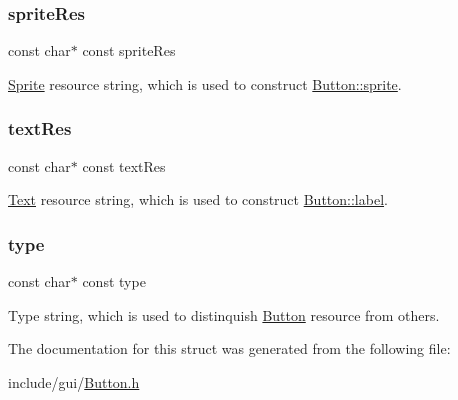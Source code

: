 \subsubsection{\texorpdfstring{sprite\+Res}{spriteRes}}
{\footnotesize\ttfamily const char$\ast$ const sprite\+Res}

\hyperlink{struct_sprite}{Sprite} resource string, which is used to construct \hyperlink{struct_button_a1128327f94baacb1570a98fca0591108}{Button\+::sprite}. \hypertarget{struct_button_scene_node__parser_strings_ab8666a8039b6fdab629c3e0853421c3c}{}\label{struct_button_scene_node__parser_strings_ab8666a8039b6fdab629c3e0853421c3c} 
\subsubsection{\texorpdfstring{text\+Res}{textRes}}
{\footnotesize\ttfamily const char$\ast$ const text\+Res}

\hyperlink{struct_text}{Text} resource string, which is used to construct \hyperlink{struct_button_ab278201aa1758916bc9e825b3833e31b}{Button\+::label}. \hypertarget{struct_button_scene_node__parser_strings_a8ff938fb2f815be425fd2859a21e6d61}{}\label{struct_button_scene_node__parser_strings_a8ff938fb2f815be425fd2859a21e6d61} 
\subsubsection{\texorpdfstring{type}{type}}
{\footnotesize\ttfamily const char$\ast$ const type}

Type string, which is used to distinquish \hyperlink{struct_button}{Button} resource from others. 

The documentation for this struct was generated from the following file\+:\begin{DoxyCompactItemize}
\item 
include/gui/\hyperlink{_button_8h}{Button.\+h}\end{DoxyCompactItemize}
